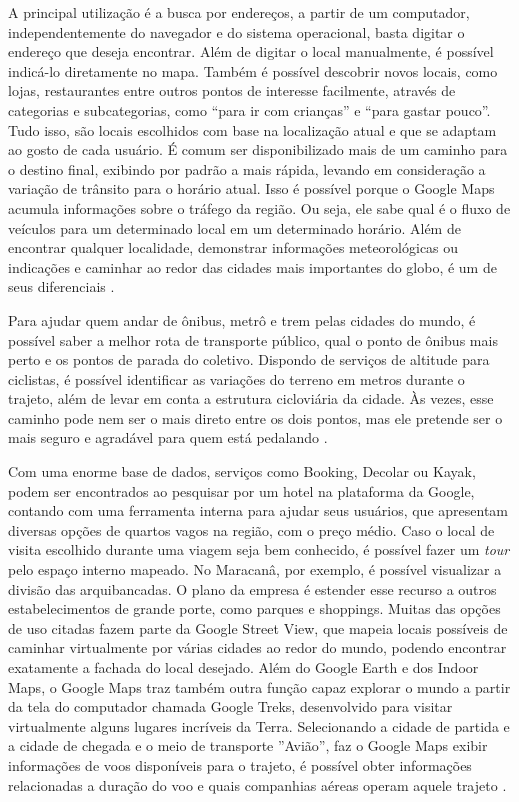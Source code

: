 A principal utilização é a busca por endereços, a partir de um computador, independentemente do navegador e do sistema operacional, basta digitar o endereço que deseja encontrar. Além de digitar o local manualmente, é possível
indicá-lo diretamente no mapa. Também é possível descobrir novos locais, como lojas, restaurantes entre outros pontos de interesse facilmente, através de categorias e subcategorias, como “para ir com crianças” e “para gastar pouco”. Tudo isso, são locais escolhidos com base na localização atual e que se adaptam ao gosto de cada usuário. É comum ser disponibilizado mais de um caminho para o destino final, exibindo por padrão a mais rápida, levando em consideração a variação de trânsito para o horário atual. Isso é possível porque o Google Maps acumula informações sobre o tráfego da região. Ou seja, ele sabe qual é o fluxo de veículos para um determinado local em um determinado horário. Além de encontrar qualquer localidade, demonstrar informações meteorológicas ou indicações e caminhar ao redor das cidades mais importantes do globo, é um de seus diferenciais \cite{google:2019}.

Para ajudar quem andar de ônibus, metrô e trem pelas cidades do mundo, é possível saber a melhor rota de transporte público, qual o ponto de ônibus mais perto e os pontos de parada do coletivo. Dispondo de serviços de altitude para ciclistas, é possível identificar as variações do terreno em metros durante o trajeto, além de levar em conta a estrutura cicloviária da cidade. Às vezes, esse caminho pode nem ser o mais direto entre os dois pontos, mas ele pretende ser o mais seguro e agradável para quem está pedalando \cite{google:2019}.

Com uma enorme base de dados, serviços como Booking, Decolar ou Kayak, podem ser encontrados ao pesquisar por um hotel na plataforma da Google, contando com uma ferramenta interna para ajudar seus usuários, que apresentam diversas opções de quartos vagos na região, com o preço médio. Caso o local de visita escolhido durante uma viagem seja bem conhecido, é possível fazer um \textit{tour} pelo espaço interno mapeado. No Maracanâ, por exemplo, é possível visualizar a divisão das arquibancadas. O plano da empresa é estender esse recurso a outros estabelecimentos de grande porte, como parques e shoppings. Muitas das opções de uso citadas fazem parte da Google Street View, que mapeia locais possíveis de caminhar virtualmente por várias cidades ao redor do mundo, podendo encontrar exatamente a fachada do local desejado. Além do Google Earth e dos Indoor Maps, o Google Maps traz também outra função capaz explorar o mundo a partir da tela do computador chamada Google Treks, desenvolvido para visitar virtualmente alguns lugares incríveis da Terra.
Selecionando a cidade de partida e a cidade de chegada e o meio de transporte ''Avião'', faz o Google Maps exibir informações de voos disponíveis para o trajeto, é possível obter informações relacionadas a duração do voo e quais companhias aéreas operam aquele trajeto \cite{google:2019}. 

